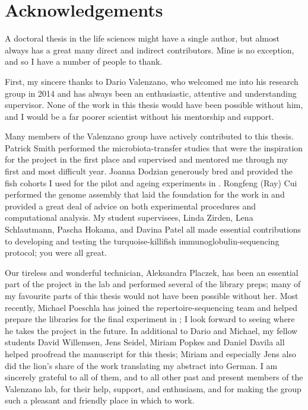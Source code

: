 {
\cleardoublepage
\setsinglecolumn
\chapter*{\centering \LARGE Acknowledgements}
\thispagestyle{empty}

A doctoral thesis in the life sciences might have a single author, but almost always has a great many direct and indirect contributors. Mine is no exception, and so I have a number of people to thank.

First, my sincere thanks to Dario Valenzano, who welcomed me into his research group in 2014 and has always been an enthusiastic, attentive and understanding supervisor. None of the work in this thesis would have been possible without him, and I would be a far poorer scientist without his mentorship and support.

Many members of the Valenzano group have actively contributed to this thesis. Patrick Smith performed the microbiota-transfer studies that were the inspiration for the project in the first place and supervised and mentored me through my first and most difficult year. Joanna Dodzian generously bred and provided the fish cohorts I used for the pilot and ageing experiments in . Rongfeng (Ray) Cui performed the genome assembly that laid the foundation for the work in  and provided a great deal of advice on both experimental procedures and computational analysis. My student supervisees, Linda Zirden, Lena Schlautmann, Pascha Hokama, and Davina Patel all made essential contributions to developing and testing the turquoise-killifish immunoglobulin-sequencing protocol; you were all great. 

Our tireless and wonderful technician, Aleksandra Placzek, has been an essential part of the \igseq project in the lab and performed several of the library preps; many of my favourite parts of this thesis would not have been possible without her. Most recently, Michael Poeschla has joined the repertoire-sequencing team and helped prepare the libraries for the final \igseq experiment in ; I look forward to seeing where he takes the project in the future. In additional to Dario and Michael, my fellow students David Willemsen, Jens Seidel, Miriam Popkes and Daniel Davila all helped proofread the manuscript for this thesis; Miriam and especially Jens also did the lion's share of the work translating my abstract into German. I am sincerely grateful to all of them, and to all other past and present members of the Valenzano lab, for their help, support, and enthusiasm, and for making the group such a pleasant and friendly place in which to work.

}
